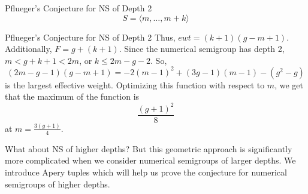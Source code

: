 \documentclass{beamer}
\newcommand{\ds}{\displaystyle}
\begin{document}
\begin{frame}{Pflueger's Conjecture for NS of Depth 2}
    \[S=\langle m,\dots,m+k\rangle\]
    
    \hfill
    
    \begin{center}
        \end{center}
\end{frame}

\begin{frame}{Pflueger's Conjecture for NS of Depth 2}
    Thus, $ewt=(k+1)(g-m+1)$. Additionally, $F=g+(k+1).$ Since the numerical semigroup has depth 2, $m<g+k+1<2m$, or $k\leq 2m-g-2.$ So, \[(2m-g-1)(g-m+1)=-2(m-1)^2 + (3g - 1)(m - 1) - (g^2 - g)\] is the largest effective weight. Optimizing this function with respect to $m$, we get that the maximum of the function is 
    \[\frac{(g+1)^2}{8}\]
    at $m=\ds\frac{3(g+1)}{4}$.
\end{frame}

\begin{frame}{What about NS of higher depths?}
    But this geometric approach is significantly more complicated when we consider numerical semigroups of larger depths. We introduce Apery tuples which will help us prove the conjecture for numerical semigroups of higher depths.
\end{frame}
\end{document}

